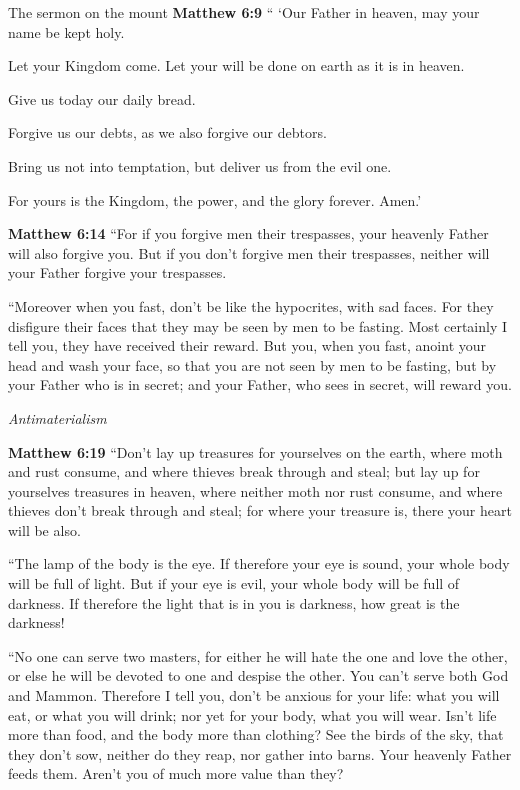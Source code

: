 \documentclass[10pt,twoside]{book}
\newcommand{\quotesize}{\normalsize{}}
\newenvironment{quotetext}{\begingroup\quotesize}{\endgroup}
\newcommand{\bible}[2]{\begin{quotetext}\textbf{#1} #2\end{quotetext}}
\newcommand{\matthew}[2]{\bible{Matthew #1}{#2}}
\newcommand{\subhead}[1]{\emph{#1}\par}
\begin{document}
\begin{section}{The sermon on the mount}
\matthew{6:9}{
`` `Our Father in heaven, may your name be kept holy.

   Let your Kingdom come.
Let your will be done on earth as it is in heaven.

   Give us today our daily bread.

   Forgive us our debts,
as we also forgive our debtors.

   Bring us not into temptation,
but deliver us from the evil one.

For yours is the Kingdom, the power, and the glory forever. Amen.'
}

\matthew{6:14}{
   ``For if you forgive men their trespasses, your heavenly Father will also forgive you.    But if you don't forgive men their trespasses, neither will your Father forgive your trespasses.

   ``Moreover when you fast, don't be like the hypocrites, with sad faces. For they disfigure their faces that they may be seen by men to be fasting. Most certainly I tell you, they have received their reward.    But you, when you fast, anoint your head and wash your face,    so that you are not seen by men to be fasting, but by your Father who is in secret; and your Father, who sees in secret, will reward you.}

\subhead{Antimaterialism}

\matthew{6:19}{
   ``Don't lay up treasures for yourselves on the earth, where moth and rust consume, and where thieves break through and steal;    but lay up for yourselves treasures in heaven, where neither moth nor rust consume, and where thieves don't break through and steal;    for where your treasure is, there your heart will be also.

   ``The lamp of the body is the eye. If therefore your eye is sound, your whole body will be full of light.    But if your eye is evil, your whole body will be full of darkness. If therefore the light that is in you is darkness, how great is the darkness!

   ``No one can serve two masters, for either he will hate the one and love the other, or else he will be devoted to one and despise the other. You can't serve both God and Mammon.    Therefore I tell you, don't be anxious for your life: what you will eat, or what you will drink; nor yet for your body, what you will wear. Isn't life more than food, and the body more than clothing?    See the birds of the sky, that they don't sow, neither do they reap, nor gather into barns. Your heavenly Father feeds them. Aren't you of much more value than they?

}
\end{section}
\end{document}
